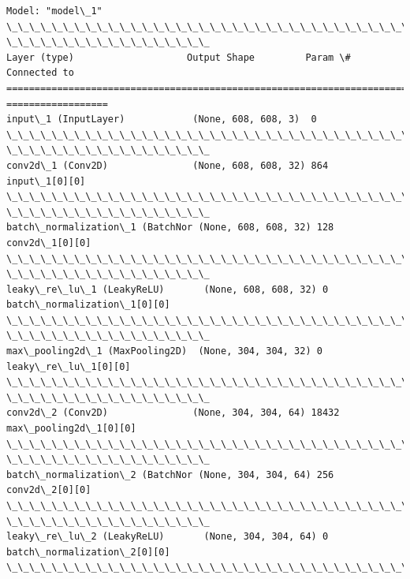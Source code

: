 \documentclass[11pt]{article}
\begin{document}
    \begin{Verbatim}[commandchars=\\\{\}]
Model: "model\_1"
\_\_\_\_\_\_\_\_\_\_\_\_\_\_\_\_\_\_\_\_\_\_\_\_\_\_\_\_\_\_\_\_\_\_\_\_\_\_\_\_\_\_\_\_\_\_\_\_\_\_\_\_\_\_\_\_\_\_\_\_\_\_\_\_\_\_\_\_\_\_\_\_\_\_\_\_\_\_\_\_
\_\_\_\_\_\_\_\_\_\_\_\_\_\_\_\_\_\_
Layer (type)                    Output Shape         Param \#     Connected to
================================================================================
==================
input\_1 (InputLayer)            (None, 608, 608, 3)  0
\_\_\_\_\_\_\_\_\_\_\_\_\_\_\_\_\_\_\_\_\_\_\_\_\_\_\_\_\_\_\_\_\_\_\_\_\_\_\_\_\_\_\_\_\_\_\_\_\_\_\_\_\_\_\_\_\_\_\_\_\_\_\_\_\_\_\_\_\_\_\_\_\_\_\_\_\_\_\_\_
\_\_\_\_\_\_\_\_\_\_\_\_\_\_\_\_\_\_
conv2d\_1 (Conv2D)               (None, 608, 608, 32) 864         input\_1[0][0]
\_\_\_\_\_\_\_\_\_\_\_\_\_\_\_\_\_\_\_\_\_\_\_\_\_\_\_\_\_\_\_\_\_\_\_\_\_\_\_\_\_\_\_\_\_\_\_\_\_\_\_\_\_\_\_\_\_\_\_\_\_\_\_\_\_\_\_\_\_\_\_\_\_\_\_\_\_\_\_\_
\_\_\_\_\_\_\_\_\_\_\_\_\_\_\_\_\_\_
batch\_normalization\_1 (BatchNor (None, 608, 608, 32) 128         conv2d\_1[0][0]
\_\_\_\_\_\_\_\_\_\_\_\_\_\_\_\_\_\_\_\_\_\_\_\_\_\_\_\_\_\_\_\_\_\_\_\_\_\_\_\_\_\_\_\_\_\_\_\_\_\_\_\_\_\_\_\_\_\_\_\_\_\_\_\_\_\_\_\_\_\_\_\_\_\_\_\_\_\_\_\_
\_\_\_\_\_\_\_\_\_\_\_\_\_\_\_\_\_\_
leaky\_re\_lu\_1 (LeakyReLU)       (None, 608, 608, 32) 0
batch\_normalization\_1[0][0]
\_\_\_\_\_\_\_\_\_\_\_\_\_\_\_\_\_\_\_\_\_\_\_\_\_\_\_\_\_\_\_\_\_\_\_\_\_\_\_\_\_\_\_\_\_\_\_\_\_\_\_\_\_\_\_\_\_\_\_\_\_\_\_\_\_\_\_\_\_\_\_\_\_\_\_\_\_\_\_\_
\_\_\_\_\_\_\_\_\_\_\_\_\_\_\_\_\_\_
max\_pooling2d\_1 (MaxPooling2D)  (None, 304, 304, 32) 0
leaky\_re\_lu\_1[0][0]
\_\_\_\_\_\_\_\_\_\_\_\_\_\_\_\_\_\_\_\_\_\_\_\_\_\_\_\_\_\_\_\_\_\_\_\_\_\_\_\_\_\_\_\_\_\_\_\_\_\_\_\_\_\_\_\_\_\_\_\_\_\_\_\_\_\_\_\_\_\_\_\_\_\_\_\_\_\_\_\_
\_\_\_\_\_\_\_\_\_\_\_\_\_\_\_\_\_\_
conv2d\_2 (Conv2D)               (None, 304, 304, 64) 18432
max\_pooling2d\_1[0][0]
\_\_\_\_\_\_\_\_\_\_\_\_\_\_\_\_\_\_\_\_\_\_\_\_\_\_\_\_\_\_\_\_\_\_\_\_\_\_\_\_\_\_\_\_\_\_\_\_\_\_\_\_\_\_\_\_\_\_\_\_\_\_\_\_\_\_\_\_\_\_\_\_\_\_\_\_\_\_\_\_
\_\_\_\_\_\_\_\_\_\_\_\_\_\_\_\_\_\_
batch\_normalization\_2 (BatchNor (None, 304, 304, 64) 256         conv2d\_2[0][0]
\_\_\_\_\_\_\_\_\_\_\_\_\_\_\_\_\_\_\_\_\_\_\_\_\_\_\_\_\_\_\_\_\_\_\_\_\_\_\_\_\_\_\_\_\_\_\_\_\_\_\_\_\_\_\_\_\_\_\_\_\_\_\_\_\_\_\_\_\_\_\_\_\_\_\_\_\_\_\_\_
\_\_\_\_\_\_\_\_\_\_\_\_\_\_\_\_\_\_
leaky\_re\_lu\_2 (LeakyReLU)       (None, 304, 304, 64) 0
batch\_normalization\_2[0][0]
\_\_\_\_\_\_\_\_\_\_\_\_\_\_\_\_\_\_\_\_\_\_\_\_\_\_\_\_\_\_\_\_\_\_\_\_\_\_\_\_\_\_\_\_\_\_\_\_\_\_\_\_\_\_\_\_\_\_\_\_\_\_\_\_\_\_\_\_\_\_\_\_\_\_\_\_\_\_\_\_

\end{Verbatim}
\end{document}

